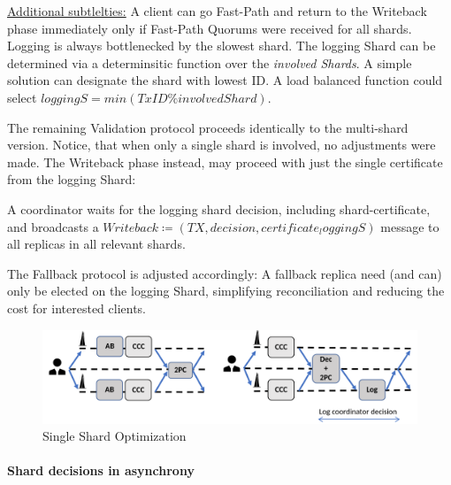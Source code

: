\underline{Additional subtlelties:} A client can go Fast-Path and return to the Writeback phase immediately only if Fast-Path Quorums were received for all shards. Logging is always bottlenecked by the slowest shard. The logging Shard can be determined via a determinsitic function over the \textit{involved Shards}. A simple solution can designate the shard with lowest ID. A load balanced function could select $loggingS = min(TxID \% involvedShard)$.

The remaining Validation protocol proceeds identically to the multi-shard version. Notice, that when only a single shard is involved, no adjustments were made. The Writeback phase instead, may proceed with just the single certificate from the logging Shard: 

A coordinator waits for the logging shard decision, including shard-certificate, and broadcasts a $Writeback \coloneqq (TX, decision, certificate_loggingS )$ message to all replicas in all relevant shards.

The Fallback protocol is adjusted accordingly: A fallback replica need (and can) only be elected on the logging Shard, simplifying reconciliation and reducing the cost for interested clients. 


\begin{figure}
\begin{center}
\includegraphics[width= \textwidth]{./figures/SingleShard.png}
\end{center}
\caption{Single Shard Optimization}
\label{fig:SingleShardOpt}
\end{figure}



\paragraph{Shard decisions in asynchrony}


